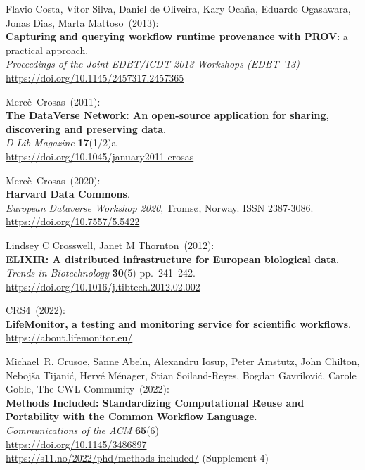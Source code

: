 \begin{thebibliography}{9}
Flavio Costa, Vítor Silva, Daniel de Oliveira, Kary Ocaña, Eduardo Ogasawara, Jonas Dias, Marta Mattoso~(2013): \\
\textbf{Capturing and querying workflow runtime provenance with PROV}: a practical approach.\\
\emph{Proceedings of the Joint EDBT/ICDT 2013 Workshops (EDBT '13)}\\
\url{https://doi.org/10.1145/2457317.2457365} 

Mercè~Crosas~(2011): \\
\textbf{The DataVerse Network: An open-source application for sharing, discovering and preserving data}.\\
\emph{D-Lib Magazine} \textbf{17}(1/2)a\\
\url{https://doi.org/10.1045/january2011-crosas}

Mercè~Crosas~(2020): \\
\textbf{Harvard Data Commons}.\\
\emph{European Dataverse Workshop 2020}, Tromsø, Norway. ISSN
2387-3086.\\
\url{https://doi.org/10.7557/5.5422}

Lindsey C Crosswell, Janet M Thornton~(2012): \\
\textbf{ELIXIR: A distributed infrastructure for European biological data}.\\
\emph{Trends in Biotechnology} \textbf{30}(5) pp.~241--242.\\
\url{https://doi.org/10.1016/j.tibtech.2012.02.002}

CRS4~(2022): \\
\textbf{LifeMonitor, a testing and monitoring service for scientific workflows}.\\
\url{https://about.lifemonitor.eu/}

Michael~R. Crusoe, Sanne Abeln, Alexandru Iosup, Peter Amstutz, John Chilton, Nebojša Tijanić, Hervé Ménager, Stian Soiland-Reyes, Bogdan Gavrilović, Carole Goble, The CWL Community~(2022): \\
\textbf{Methods Included: Standardizing Computational Reuse and Portability with the Common Workflow Language}.\\
\emph{Communications of the ACM} \textbf{65}(6)\\
\url{https://doi.org/10.1145/3486897} \\
\url{https://s11.no/2022/phd/methods-included/} (Supplement 4)


\end{thebibliography}
